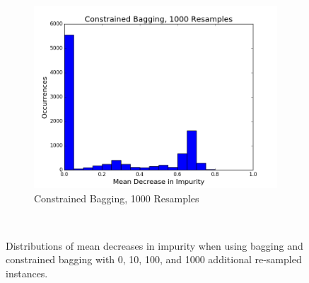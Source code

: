 \begin{figure}[H]
\begin{subfigure}[b]{0.45\textwidth}
    \includegraphics[width=\textwidth]{figures/random_forests/bagging_bias_constrained_bagging_hist_1000.png}
    \caption{Constrained Bagging, 1000 Resamples}
    \label{fig:bagging-bias-constrained-1000}
  \end{subfigure}
  ~
  \caption{Distributions of mean decreases in impurity when using bagging and constrained bagging with 0, 10, 100, and 1000 additional re-sampled instances.}
  \label{fig:bagging-bias}
\end{figure}

